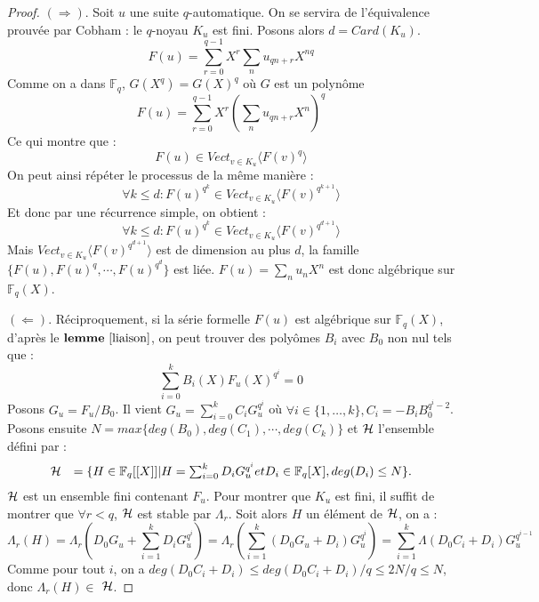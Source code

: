 \documentclass[12pt]{article}
\theoremstyle{plain}
\theoremstyle{definition}
\theoremstyle{remark}
\begin{document}
\begin{proof}
  $(\Rightarrow)$. Soit $u$ une suite $q$-automatique. On se servira de l'\'equivalence prouv\'ee par
  Cobham : le $q$-noyau $K_{u}$ est fini. Posons alors $d=Card(K_{u})$.
  $$F(u)=\sum_{r=0}^{q-1}X^{r}\sum_{n}u_{qn+r}X^{nq}$$
  Comme on a dans $\mathbb{F}_{q}$, $G(X^{q})=G(X)^{q}$ o\`u $G$ est un polyn\^ome
  $$F(u)=\sum_{r=0}^{q-1}X^{r}(\sum_{n}u_{qn+r}X^{n})^{q}$$
  Ce qui montre que :
  $$F(u)\in Vect_{v\in K_{u}}\langle{F(v)^{q}}\rangle$$
  On peut ainsi r\'ep\'eter le processus de la m\^eme mani\`ere :
  $$\forall{k}\le{d}:F(u)^{q^{k}}\in Vect_{v\in K_{u}}\langle{F(v)^{q^{k+1}}}\rangle$$
  Et donc par une r\'ecurrence simple, on obtient :
  $$\forall{k}\le{d}:F(u)^{q^{k}}\in Vect_{v\in K_{u}}\langle{F(v)^{q^{d+1}}}\rangle$$
  Mais $Vect_{v\in K_{u}}\langle{F(v)^{q^{d+1}}}\rangle$ est de dimension au plus $d$, la famille $\{F(u),F(u)^{q},
  \cdots,F(u)^{q^{d}}\}$ est li\'ee. $F(u)=\sum_{n}u_{n}X^{n}$ est donc alg\'ebrique sur $\mathbb{F}_{q}(X)$.

  $(\Leftarrow)$. R\'eciproquement, si la s\'erie formelle $F(u)$ est alg\'ebrique sur $\mathbb{F}_{q}(X)$, d'apr\`es
  le $\mathbf{lemme\ \ref{liaison}}$, on peut trouver des poly\^omes $B_{i}$ avec $B_{0}$ non nul tels que :
  $$\sum_{i=0}^{k}B_{i}(X)F_{u}(X)^{q^{i}}=0$$
  Posons $G_{u}=F_{u}/B_{0}$. Il vient $G_{u}=\sum_{i=0}^{k}C_{i}G_{u}^{q^{i}}$ o\`u $\forall{i}\in\{1,\ldots,k\},C_{i}
  =-B_{i}B_{0}^{q^{i}-2}$. 
  Posons ensuite $N=max\{deg(B_{0}),deg(C_{1}),\cdots,deg(C_{k})\}$ et $\cal{H}$ l'ensemble d\'efini par :
  \begin{displaymath}
  \begin{array}{cc}
    \cal{H}&=\{H\in\mathbb{F}_{q}[[X]]|H=\sum_{i=0}^{k}D_{i}G_{u}^{q^{i}} et D_{i}\in\mathbb{F}_{q}
    [X],deg(D_{i})\le{N}\}.
  \end{array}
  \end{displaymath}
  $\cal{H}$ est un ensemble fini contenant $F_{u}$. Pour montrer que $K_{u}$ est fini, il suffit de montrer
  que $\forall{r}<q$, $\cal{H}$ est stable par $\Lambda_{r}$. Soit alors $H$ un \'el\'ement de $\cal{H}$, on a :
  $$\Lambda_{r}(H)=\Lambda_{r}(D_{0}G_{u}+\sum_{i=1}^{k}D_{i}G_{u}^{q^{i}})=\Lambda_{r}(\sum_{i=1}^{k}
  (D_{0}G_{u}+D_{i})G_{u}^{q^{i}})=\sum_{i=1}^{k}\Lambda(D_{0}C_{i}+D_{i})G_{u}^{q^{i-1}}$$
  Comme pour tout $i$, on a $deg(D_{0}C_{i}+D_{i})\le{deg(D_{0}C_{i}+D_{i})}/{q}\le{2N}/{q}\le{N}$, donc
  $\Lambda_{r}(H)\in$ $\cal{H}$.
\end{proof}
\end{document}
